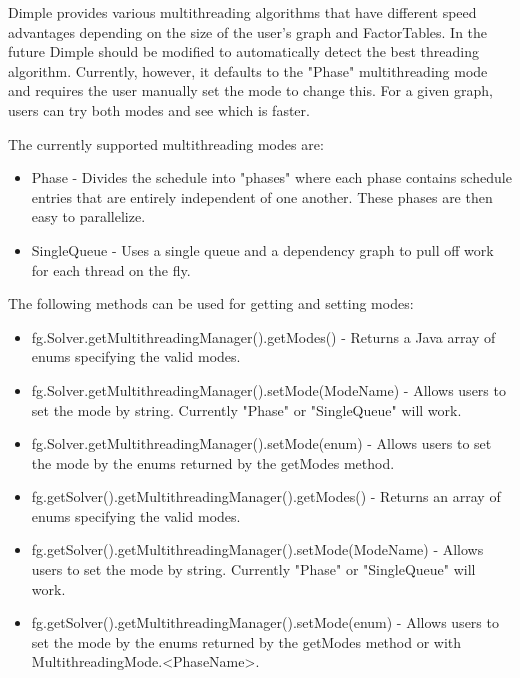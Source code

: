 Dimple provides various multithreading algorithms that have different speed advantages depending on the size of the user's graph and FactorTables.  In the future Dimple should be modified to automatically detect the best threading algorithm.  Currently, however, it defaults to the "Phase" multithreading mode and requires the user manually set the mode to change this.  For a given graph, users can try both modes and see which is faster.

The currently supported multithreading modes are:

\begin{itemize}
\item Phase - Divides the schedule into "phases" where each phase contains schedule entries that are entirely independent of one another.  These phases are then easy to parallelize.  
\item SingleQueue - Uses a single queue and a dependency graph to pull off work for each thread on the fly.  
\end{itemize}

The following methods can be used for getting and setting modes:


\ifmatlab

\begin{itemize}
\item fg.Solver.getMultithreadingManager().getModes() - Returns a Java array of enums specifying the valid modes.
\item fg.Solver.getMultithreadingManager().setMode(ModeName) - Allows users to set the mode by string.  Currently "Phase" or "SingleQueue" will work.
\item fg.Solver.getMultithreadingManager().setMode(enum) - Allows users to set the mode by the enums returned by the getModes method.
\end{itemize}

\fi

\ifjava
\begin{itemize}
\item fg.getSolver().getMultithreadingManager().getModes() - Returns an array of enums specifying the valid modes.
\item fg.getSolver().getMultithreadingManager().setMode(ModeName) - Allows users to set the mode by string.  Currently "Phase" or "SingleQueue" will work.
\item fg.getSolver().getMultithreadingManager().setMode(enum) - Allows users to set the mode by the enums returned by the getModes method or with MultithreadingMode.<PhaseName>.
\end{itemize}
\fi

